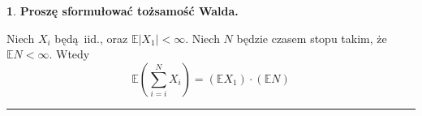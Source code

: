 \documentclass[
    twocolumn,
    twoside,
    fontsize=11pt,
    paper=A0,
    DIV=30
]{scrartcl}
\theoremstyle{definition}
\newtheorem{pytanie}{}
\theoremstyle{break}
\newenvironment{odpowiedź}{\vspace{-0.7em}}{\vspace{0.3em}\hrule}
\begin{document}
\begin{pytanie}
\textbf{Proszę sformułować tożsamość Walda.}
\end{pytanie}
\begin{odpowiedź}
    Niech $X_i$ będą iid., oraz $\mathbb{E}|X_1| < \infty$.
    Niech $N$ będzie czasem stopu takim, że $\mathbb{E}N < \infty$.
    Wtedy \[
    \mathbb{E}\left( \sum_{i = i}^N X_i \right)=
    \left(\mathbb{E}X_1 \right)\cdot \left(\mathbb{E}N \right)
    \]
\end{odpowiedź}
\end{document}
